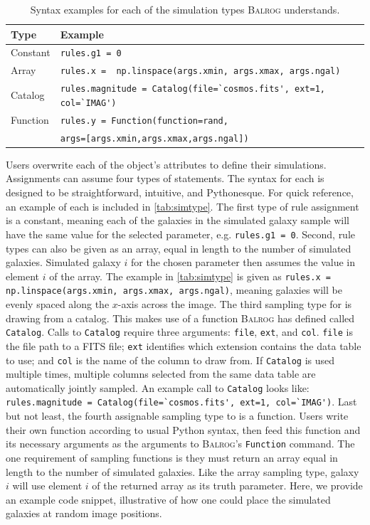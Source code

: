 \documentclass[12pt]{book}
\newcommand{\codett}[1]{\lstinline{#1}}
\newcommand{\py}{Python}
\newcommand{\balrog}{\textsc{Balrog}}
\begin{document}
\begin{table} 
\caption{Syntax examples for each of the simulation types \balrog{} understands.} \label{tab:simtype}
\begin{tabular} {l l}
\toprule
\textbf{Type} & \textbf{Example} \\ \midrule
Constant & \codett{rules.g1 = 0} \\
Array & \codett{rules.x =  np.linspace(args.xmin, args.xmax, args.ngal)} \\
Catalog & \codett{rules.magnitude = Catalog(file=`cosmos.fits', ext=1, col=`IMAG')} \\
Function & \codett{rules.y = Function(function=rand,} \\
 & \hspace{1.55in} \codett{args=[args.xmin,args.xmax,args.ngal])} \\ \bottomrule
\end{tabular}
\end{table}

Users overwrite
each of the \simrules{} object's attributes to define their simulations.
Assignments can assume four types of statements. 
The syntax for each is designed to be straightforward, intuitive, and \py{}esque.
For quick reference, an example of each is included in \autoref{tab:simtype}.
The first type of rule assignment is a constant, meaning each of the galaxies in the simulated galaxy sample
will have the same value for the selected parameter, e.g. \codett{rules.g1 = 0}.
Second, rule types can also be given as an array, equal in length to the number of simulated galaxies. 
Simulated galaxy $i$ for the chosen parameter then assumes the value in element $i$ of the array.
The example in \autoref{tab:simtype} is given as \codett{rules.x =  np.linspace(args.xmin, args.xmax, args.ngal)},
meaning galaxies will be evenly spaced along the $x$-axis across the image.
The third sampling type for \simrules{} is drawing from a catalog. 
This makes use of a function \balrog{} has defined called \codett{Catalog}. 
Calls to \codett{Catalog} require three arguments: \codett{file}, \codett{ext}, and \codett{col}.
\codett{file} is the file path to a FITS file;
\codett{ext} identifies which extension contains the data table to use; and
\codett{col} is the name of the column to draw from.
If \codett{Catalog} is used multiple times,
multiple columns selected from the same data table are automatically jointly sampled.
An example call to \codett{Catalog} looks like: 
\codett{rules.magnitude = Catalog(file=`cosmos.fits', ext=1, col=`IMAG')}.
Last but not least, the fourth assignable sampling type to \simrules{} is a function. 
Users write their own function according to usual \py{} syntax,
then feed this function and its necessary arguments as the arguments to
\balrog{}'s \codett{Function} command. 
The one requirement of sampling functions is they must return an array equal in 
length to the number of simulated galaxies.
Like the array sampling type, galaxy $i$ will use element $i$ of the returned array as its truth parameter.
Here, we provide an example code snippet, illustrative of how one could place the simulated galaxies at random image positions. 
\end{document}
